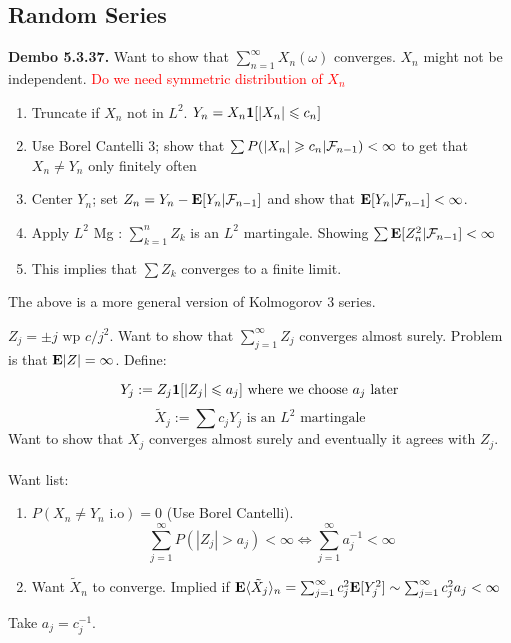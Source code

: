 \documentclass{article}
\newcommand\myworries[1]{\textcolor{red}{#1}}
\begin{document}


\subsection{Random Series}
\begin{recipe}
\textbf{Dembo 5.3.37.} Want to show that $\sum_{n=1}^\infty X_n(\omega)$ converges. $X_n$ might not be independent. \myworries{Do we need symmetric distribution of $X_n$}
\begin{enumerate}
	\item Truncate if $X_n$ not in $L^2$. $Y_n = X_n \boldsymbol{1}[|X_n|\leqslant c_n]$ 
	\item Use Borel Cantelli 3; show that $\sum P(|X_n| \geqslant c_n |\mathcal F_{n-1}) <\infty $ to get that $X_n \neq Y_n$ only finitely often
	\item Center $Y_n$; set $Z_n = Y_n - \mathbf{E}[Y_n |\mathcal F_{n-1}]$ and show that $\mathbf{E}[Y_n |\mathcal F_{n-1}]<\infty$.
	\item Apply $L^2$ Mg : $\sum_{k=1}^n Z_k$ is an $L^2$ martingale. Showing $\sum \mathbf{E} [Z_n^2 |\mathcal F_{n-1}]<\infty$ 
	\item This implies that $\sum Z_k$ converges to a finite limit. 
\end{enumerate}
\end{recipe}

The above is a more general version of Kolmogorov 3 series. 

\begin{example}[2008 Q4]

$Z_j = \pm j \text{ wp } c/j^2$. Want to show that $\sum_{j=1}^\infty Z_j$ converges almost surely. Problem is that $\mathbf{E} |Z| = \infty$. Define:

$$Y_j := Z_j \boldsymbol{1}[|Z_j| \leqslant a_j] \text{ where we choose $a_j$ later}$$
$$\tilde X_j := \sum c_j Y_j \text{ is an $L^2$ martingale}$$
Want to show that $X_j$ converges almost surely and eventually it agrees with $Z_j$. \\\\
Want list:
\begin{enumerate}
	\item $P(X_n \neq Y_n \text{ i.o}) = 0$ (Use Borel Cantelli).
	$$\sum_{j=1}^\infty P(|Z_j| >a_j) <\infty \iff \sum_{j=1}^\infty a_j^{-1} <\infty$$
	\item Want $\tilde X_n$ to converge. Implied if $\mathbf{E} \langle \tilde X_j \rangle_n = \sum_{j=1}^\infty c_j^2 \mathbf{E}[Y_j^2] \sim  \sum_{j=1}^\infty c_j^2 a_j <\infty$
\end{enumerate}
Take $a_j = c_j^{-1}$. 

\end{example}
\end{document}
